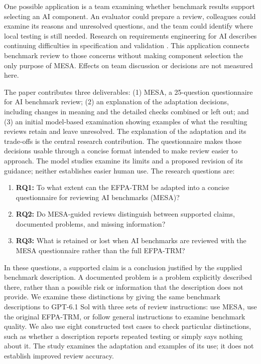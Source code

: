 \documentclass[10pt,conference]{IEEEtran}
\begin{document}
One possible application is a team examining whether benchmark results support selecting an AI component. An evaluator could prepare a review, colleagues could examine its reasons and unresolved questions, and the team could identify where local testing is still needed. Research on requirements engineering for AI describes continuing difficulties in specification and validation \cite{habiba_re4ai_maturity_2024}. This application connects benchmark review to those concerns without making component selection the only purpose of MESA. Effects on team discussion or decisions are not measured here.

The paper contributes three deliverables: (1) MESA, a 25-question questionnaire for AI benchmark review; (2) an explanation of the adaptation decisions, including changes in meaning and the detailed checks combined or left out; and (3) an initial model-based examination showing examples of what the resulting reviews retain and leave unresolved. The explanation of the adaptation and its trade-offs is the central research contribution. The questionnaire makes those decisions usable through a concise format intended to make review easier to approach. The model studies examine its limits and a proposed revision of its guidance; neither establishes easier human use. The research questions are:
\begin{enumerate}
\item \textbf{RQ1:} To what extent can the EFPA-TRM be adapted into a concise questionnaire for reviewing AI benchmarks (MESA)?
\item \textbf{RQ2:} Do MESA-guided reviews distinguish between supported claims, documented problems, and missing information?
\item \textbf{RQ3:} What is retained or lost when AI benchmarks are reviewed with the MESA questionnaire rather than the full EFPA-TRM?
\end{enumerate}
In these questions, a supported claim is a conclusion justified by the supplied benchmark description. A documented problem is a problem explicitly described there, rather than a possible risk or information that the description does not provide. We examine these distinctions by giving the same benchmark descriptions to GPT-6.1 Sol with three sets of review instructions: use MESA, use the original EFPA-TRM, or follow general instructions to examine benchmark quality. We also use eight constructed test cases to check particular distinctions, such as whether a description reports repeated testing or simply says nothing about it. The study examines the adaptation and examples of its use; it does not establish improved review accuracy.
\end{document}
